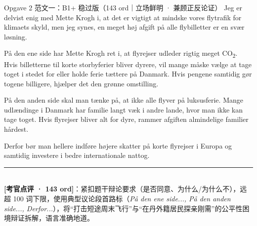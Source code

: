 \begin{emailbox}{Opgave 2 范文一：B1+ 稳过版（143 ord｜立场鲜明 · 兼顾正反论证）}
Jeg er delvist enig med Mette Krogh i, at det er vigtigt at mindske vores flytrafik for klimaets skyld, men jeg synes, en meget høj afgift på alle flybilletter er en svær løsning.

\vspace{0.25em}
På den ene side har Mette Krogh ret i, at flyrejser udleder rigtig meget CO\textsubscript{2}. Hvis billetterne til korte storbyferier bliver dyrere, vil mange måske vælge at tage toget i stedet for eller holde ferie tættere på Danmark. Hvis pengene samtidig gør togene billigere, hjælper det den grønne omstilling.

\vspace{0.25em}
På den anden side skal man tænke på, at ikke alle flyver på luksusferie. Mange udlændinge i Danmark har familie langt væk i andre lande, hvor man ikke kan tage toget. Hvis flyrejser bliver alt for dyre, rammer afgiften almindelige familier hårdest.

\vspace{0.25em}
Derfor bør man hellere indføre højere skatter på korte flyrejser i Europa og samtidig investere i bedre internationale nattog.

\vspace{0.3em}
\rule{\linewidth}{0.4pt}\\[0.2em]
\small\textbf{\color{NCDTeal}[考官点评 · 143 ord]}：紧扣题干辩论要求（是否同意、为什么/为什么不），远超 100 词下限，使用典型议论段首路标（\textit{På den ene side..., På den anden side..., Derfor...}），将“打击短途周末飞行”与“在丹外籍居民探亲刚需”的公平性困境辩证拆解，语言准确地道。
\end{emailbox}

